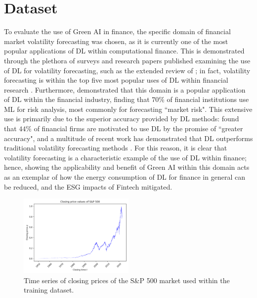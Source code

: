 \documentclass[a4paper, 11pt]{report}
\begin{document}
    \section{Dataset}
    \label{section: dataset}

    To evaluate the use of Green AI in finance, the specific domain of financial market volatility forecasting was chosen, as it is currently one of the most popular applications of DL within computational finance. This is demonstrated through the plethora of surveys and research papers published examining the use of DL for volatility forecasting, such as the extended review of \citet{ge-2022}; in fact, volatility forecasting is within the top five most popular uses of DL within financial research \citep{sezer-2019}. Furthermore, \citet{chartis-2019} demonstrated that this domain is a popular application of DL within the financial industry, finding that $70\%$ of financial institutions use ML for risk analysis, most commonly for forecasting ``market risk". This extensive use is primarily due to the superior accuracy provided by DL methods: \citet{chartis-2019} found that $44\%$ of financial firms are motivated to use DL by the promise of ``greater accuracy", and a multitude of recent work has demonstrated that DL outperforms traditional volatility forecasting methods \citep{rodikov-2022}. For this reason, it is clear that volatility forecasting is a characteristic example of the use of DL within finance; hence, showing the applicability and benefit of Green AI within this domain acts as an exemplar of how the energy consumption of DL for finance in general can be reduced, and the ESG impacts of Fintech mitigated.

    \begin{figure}[ht]
        \centering
        \includegraphics[width=0.5\textwidth]{dataset.png}
        \caption{\centering Time series of closing prices of the S\&P 500 market used within the training dataset.}
        \label{fig: prices}
    \end{figure}
\end{document}
